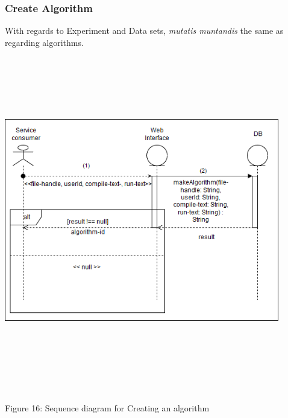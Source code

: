     	\subsubsection{Create Algorithm}
    \par With regards to Experiment and Data sets,
    {\textit{mutatis muntandis} the same as regarding algorithms.} \newline \newline
    \includegraphics[width=12cm,height=15cm,keepaspectratio]{input_unit/images/create_algorithm_sequence_diagram.png}
    \begin{center}
    	\small{Figure 16: Sequence diagram for Creating an algorithm }
    \end{center}
    \newpage
